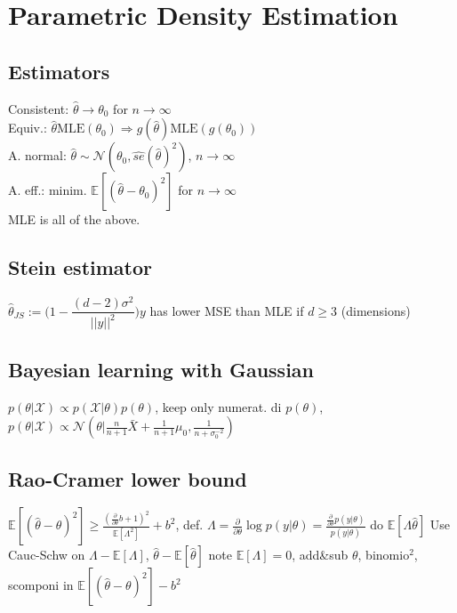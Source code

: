 \section*{Parametric Density Estimation}
\subsection*{Estimators}
Consistent: $\hat{\theta}\rightarrow\theta_0$ for $n\rightarrow\infty$\\
Equiv.: $\hat{\theta} \mathrm{MLE}(\theta_0) \Rightarrow g(\hat{\theta}) \mathrm{MLE}(g(\theta_0))$ \\
A. normal: $\hat{\theta}\sim\mathcal{N}(\theta_0, \hat{se}(\hat{\theta})^2)$, $n\rightarrow\infty$\\
A. eff.: minim. $\mathbb{E}[(\hat{\theta} - \theta_0)^2]$ for $n\rightarrow\infty$\\
MLE is all of the above. \\

\subsection*{Stein estimator}
$\hat{\theta}_{JS} := \Big(1 - \dfrac{(d-2)\sigma^2}{||y||^2} \Big) y$ has lower MSE than MLE if $d \geq 3$ (dimensions)

\subsection*{Bayesian learning with Gaussian}
$p(\theta|\mathcal{X}) \propto p(\mathcal{X}|\theta)p(\theta) $, keep only numerat. di $p(\theta)$, \\
$p(\theta|\mathcal{X}) \propto \mathcal{N}(\theta|\frac{n}{n+1}\bar{X}+\frac1{n+1}\mu_0, \frac1{n+\sigma_0^{-2}})$

\subsection*{Rao-Cramer lower bound}
$\mathbb{E}[(\hat{\theta} - \theta)^2] \geq \frac{(\frac{\partial}{\partial\theta}b + 1)^2}{\mathbb{E}[\Lambda^2]}+b^2$, def.
$\Lambda = \frac{\partial}{\partial\theta}\log p(y|\theta)=\frac{\frac{\partial}{\partial\theta}p(y|\theta)}{p(y|\theta)}$ do $\mathbb E[\Lambda\hat\theta]$
Use Cauc-Schw on $\Lambda-\mathbb{E}[\Lambda]$, $\hat{\theta}-\mathbb{E}[\hat{\theta}]$ note $\mathbb{E}[\Lambda]=0$, add\&sub $\theta$, binomio$^2$, scomponi in $\mathbb{E}[(\hat\theta -\theta)^2] - b^2$

